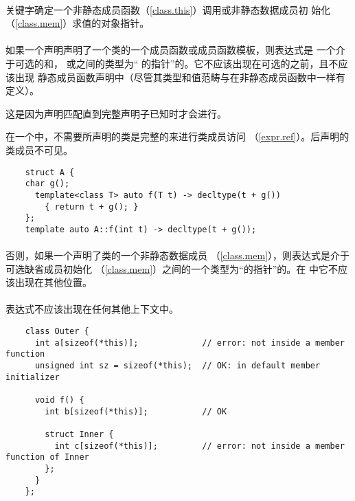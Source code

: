 \paragraph{} %
关键字确定一个非静态成员函数（\ref{class.this}）调用或非静态数据成员初
始化（\ref{class.mem}）求值的对象指针。

\paragraph{} %
如果一个声明声明了一个类的一个成员函数或成员函数模板，则表达式是
一个介于可选的和，
或之间的类型为“ 
的指针”的\prvalue{}。它不应该出现在可选的之前，且不应该出现
静态成员函数声明中（尽管其类型和值范畴与在非静态成员函数中一样有定义）。

\begin{note}
  这是因为声明匹配直到完整声明子已知时才会进行。
\end{note}

\begin{note}
  在一个中，不需要所声明的类是完整的来进行类成员访问
  （\ref{expr.ref}）。后声明的类成员不可见。

  \begin{example}
    \begin{lstlisting}
    struct A {
    char g();
      template<class T> auto f(T t) -> decltype(t + g())
        { return t + g(); }
    };
    template auto A::f(int t) -> decltype(t + g());
    \end{lstlisting}
  \end{example}

\end{note}

\paragraph{} %
否则，如果一个声明了类的一个非静态数据成员
（\ref{class.mem}），则表达式是介于可选缺省成员初始化
（\ref{class.mem}）之间的一个类型为“的指针”的\prvalue{}。在
中它不应该出现在其他位置。

\paragraph{} %
表达式不应该出现在任何其他上下文中。

\begin{example}
  \begin{lstlisting}
    class Outer {
      int a[sizeof(*this)];             // error: not inside a member function
      unsigned int sz = sizeof(*this);  // OK: in default member initializer

      void f() {
        int b[sizeof(*this)];           // OK

        struct Inner {
          int c[sizeof(*this)];         // error: not inside a member function of Inner
        };
      }
    };
  \end{lstlisting}
\end{example}
